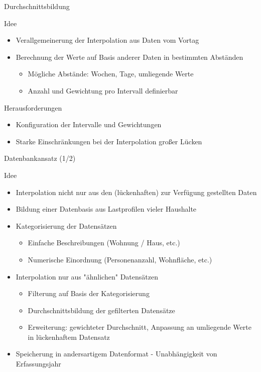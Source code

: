 \begin{frame}{Durchschnittsbildung}
\begin{block}{Idee}
\begin{itemize}
	\item Verallgemeinerung der Interpolation aus Daten vom Vortag
	\item Berechnung der Werte auf Basis anderer Daten in bestimmten Abständen
	\begin{itemize}
		\item Mögliche Abstände: Wochen, Tage, umliegende Werte
		\item Anzahl und Gewichtung pro Intervall definierbar
	\end{itemize}
\end{itemize}
\end{block}
\begin{block}{Herausforderungen}
\begin{itemize}
	\item Konfiguration der Intervalle und Gewichtungen
	\item Starke Einschränkungen bei der Interpolation großer Lücken
\end{itemize}
\end{block}
\end{frame}

\begin{frame}{Datenbankansatz (1/2)}
\begin{block}{Idee}
\begin{itemize}
	\item Interpolation nicht nur aus den (lückenhaften) zur Verfügung gestellten Daten
	\item Bildung einer Datenbasis aus Lastprofilen vieler Haushalte
	\item Kategorisierung der Datensätzen
	\begin{itemize}
		\item Einfache Beschreibungen (Wohnung / Haus, etc.)
		\item Numerische Einordnung (Personenanzahl, Wohnfläche, etc.)
	\end{itemize}
	\item Interpolation nur aus "ähnlichen" Datensätzen
	\begin{itemize}
		\item Filterung auf Basis der Kategorisierung
		\item Durchschnittsbildung der gefilterten Datensätze
		\item Erweiterung: gewichteter Durchschnitt, Anpassung an umliegende Werte in lückenhaftem Datensatz
	\end{itemize}
	\item Speicherung in andersartigem Datenformat - Unabhängigkeit von Erfassungsjahr
\end{itemize}
\end{block}
\end{frame}

